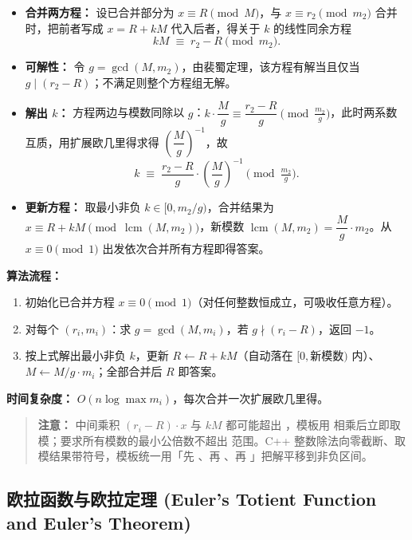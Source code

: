 \begin{itemize}
  \item \textbf{合并两方程：} 设已合并部分为 $x \equiv R \pmod{M}$，与 $x \equiv r_2 \pmod{m_2}$ 合并时，把前者写成 $x = R + kM$ 代入后者，得关于 $k$ 的线性同余方程
  \[ kM \;\equiv\; r_2 - R \pmod{m_2}. \]
  \item \textbf{可解性：} 令 $g = \gcd(M, m_2)$，由裴蜀定理，该方程有解当且仅当 $g \mid (r_2 - R)$；不满足则整个方程组无解。
  \item \textbf{解出 $k$：} 方程两边与模数同除以 $g$：$k \cdot \dfrac{M}{g} \equiv \dfrac{r_2 - R}{g} \pmod{\tfrac{m_2}{g}}$，此时两系数互质，用扩展欧几里得求得 $\left(\dfrac{M}{g}\right)^{-1}$，故
  \[ k \;\equiv\; \frac{r_2 - R}{g} \cdot \left(\frac{M}{g}\right)^{-1} \pmod{\tfrac{m_2}{g}}. \]
  \item \textbf{更新方程：} 取最小非负 $k \in [0, m_2/g)$，合并结果为 $x \equiv R + kM \pmod{\operatorname{lcm}(M, m_2)}$，新模数 $\operatorname{lcm}(M, m_2) = \dfrac{M}{g} \cdot m_2$。从 $x \equiv 0 \pmod 1$ 出发依次合并所有方程即得答案。
\end{itemize}

\textbf{算法流程：}

\begin{enumerate}
  \item 初始化已合并方程 $x \equiv 0 \pmod 1$（对任何整数恒成立，可吸收任意方程）。
  \item 对每个 $(r_i, m_i)$：求 $g = \gcd(M, m_i)$，若 $g \nmid (r_i - R)$，返回 $-1$。
  \item 按上式解出最小非负 $k$，更新 $R \gets R + kM$（自动落在 $[0, \text{新模数})$ 内）、$M \gets M/g \cdot m_i$；全部合并后 $R$ 即答案。
\end{enumerate}

\textbf{时间复杂度：} $O(n \log \max m_i)$，每次合并一次扩展欧几里得。



\begin{quote}
\textbf{注意：} 中间乘积 $(r_i - R) \cdot x$ 与 $kM$ 都可能超出 ，模板用  相乘后立即取模；要求所有模数的最小公倍数不超出  范围。C++ 整数除法向零截断、取模结果带符号，模板统一用「先 \code{\%}、再 \code{+}、再 \code{\%}」把解平移到非负区间。
\end{quote}

\subsection{欧拉函数与欧拉定理 (Euler's Totient Function and Euler's Theorem)}


